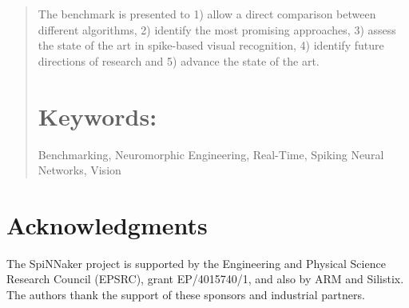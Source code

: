 \documentclass[pdftex]{bioinfo}
\begin{document}
\begin{abstract}
The benchmark is presented to 1) allow a direct comparison between different algorithms, 2) identify the most promising approaches, 3) assess the state of the art in spike-based visual recognition, 4) identify future directions of research and 5) advance the state of the art.


 



\tiny
\section{Keywords:} Benchmarking, Neuromorphic Engineering, Real-Time, Spiking Neural Networks, Vision
\end{abstract}

%
\section*{Acknowledgments}
The SpiNNaker project is supported by the Engineering and Physical Science Research Council (EPSRC), grant EP/4015740/1, and also by ARM and Silistix. The authors thank the support of these sponsors and industrial partners.


\end{document}
